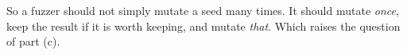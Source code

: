 \documentclass[addpoints]{exam}
\newcommand{\Code}[1]{\texttt{#1}}
\begin{document}
\begin{questions}
\begin{parts}
\begin{solution}
    So a fuzzer should not simply mutate a seed many times. It should
    mutate \emph{once}, keep the result if it is worth keeping, and
    mutate \emph{that}. Which raises the question of part (c).
  \end{solution}





\end{parts}

\end{questions}
\end{document}
